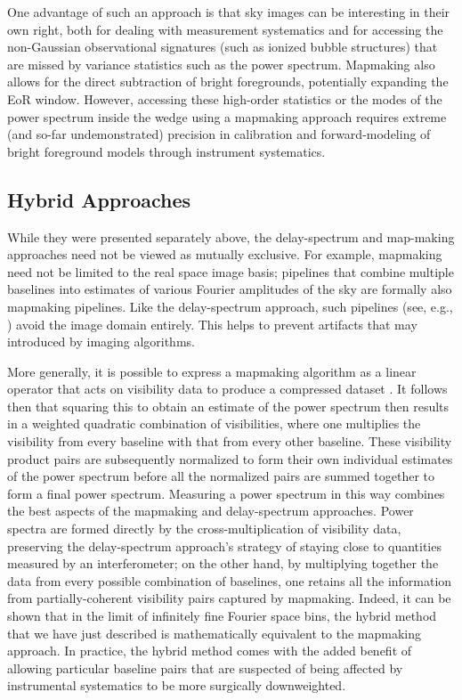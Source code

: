 \documentclass[preprint,11pt]{aastex}
\begin{document}
One advantage of such an approach is that sky images can be interesting in their own right, both for dealing with measurement systematics and for accessing the non-Gaussian observational signatures (such as ionized bubble structures) that are missed by variance statistics such as the power spectrum. Mapmaking also allows for the direct subtraction of bright foregrounds, potentially expanding the EoR window. However, accessing these high-order statistics or the modes of the power spectrum inside the wedge using a mapmaking approach requires extreme (and so-far undemonstrated) precision in calibration and forward-modeling of bright foreground models through instrument systematics. 



\subsection{Hybrid Approaches}
\label{sec:hybridapproach}

While they were presented separately above, the delay-spectrum and map-making approaches need not be viewed as mutually exclusive. For example, mapmaking need not be limited to the real space image basis; pipelines that combine multiple baselines into estimates of various Fourier amplitudes of the sky are formally also mapmaking pipelines. Like the delay-spectrum approach, such pipelines (see, e.g., \citealt{trott_et_al2016}) avoid the image domain entirely. This helps to prevent artifacts that may introduced by imaging algorithms.

More generally, it is possible to express a mapmaking algorithm as a linear operator that acts on visibility data to produce a compressed dataset \citep{dillon_et_al2015a}. It follows then that squaring this to obtain an estimate of the power spectrum then results in a weighted quadratic combination of visibilities, where one multiplies the visibility from every baseline with that from every other baseline. These visibility product pairs are subsequently normalized to form their own individual estimates of the power spectrum before all the normalized pairs are summed together to form a final power spectrum. Measuring a power spectrum in this way combines the best aspects of the mapmaking and delay-spectrum approaches. Power spectra are formed directly by the cross-multiplication of visibility data, preserving the delay-spectrum approach's strategy of staying close to quantities measured by an interferometer; on the other hand, by multiplying together the data from every possible combination of baselines, one retains all the information from partially-coherent visibility pairs captured by mapmaking. Indeed, it can be shown \citep{liu_et_al2014a} that in the limit of infinitely fine Fourier space bins, the hybrid method that we have just described is mathematically equivalent to the mapmaking approach. In practice, the hybrid method comes with the added benefit of allowing particular baseline pairs that are suspected of being affected by instrumental systematics to be more surgically downweighted. 
\end{document}
